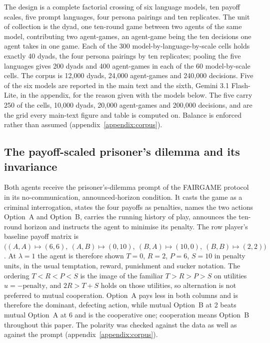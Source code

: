 \documentclass[openacc]{rsproca_new}
\newcommand{\lam}{\lambda}
\begin{document}
The design is a complete factorial crossing of six language models, ten payoff
scales, five prompt languages, four persona pairings and ten replicates. The
unit of collection is the dyad, one ten-round game between two agents of the
same model, contributing two agent-games, an agent-game being the ten decisions
one agent takes in one game. Each of the 300 model-by-language-by-scale cells
holds exactly 40 dyads, the four persona pairings by ten replicates; pooling
the five languages gives 200 dyads and 400 agent-games in each of the 60
model-by-scale cells. The corpus is 12{,}000 dyads, 24{,}000 agent-games and
240{,}000 decisions. Five of the six models are reported in the main text and
the sixth, Gemini 3.1 Flash-Lite, in the appendix, for the reason given with
the models below. The five carry 250 of the cells, 10{,}000 dyads, 20{,}000
agent-games and 200{,}000 decisions, and are the grid every main-text figure
and table is computed on. Balance is enforced rather than assumed
(appendix~\ref{appendix:corpus}).

\subsection{The payoff-scaled prisoner's dilemma and its invariance}\label{sec:gameImportance}

Both agents receive the prisoner's-dilemma prompt of the FAIRGAME
protocol~\cite{buscemi2025fairgame} in its no-communication, announced-horizon
condition. It casts the game as a criminal interrogation, states the four
payoffs as penalties, names the two actions Option~A and Option~B,
carries the running history of play, announces the ten-round horizon and
instructs the agent to minimise its penalty. The row player's baseline payoff
matrix is
$\bigl((A,A)\!\mapsto\!(6,6),\ (A,B)\!\mapsto\!(0,10),\
(B,A)\!\mapsto\!(10,0),\ (B,B)\!\mapsto\!(2,2)\bigr)$.
At $\lam = 1$ the agent is therefore shown $T = 0$, $R = 2$, $P = 6$, $S = 10$
in penalty units, in the usual temptation, reward, punishment and sucker
notation. The ordering $T < R < P < S$ is the image of the familiar
$T > R > P > S$ on utilities $u = -\text{penalty}$, and $2R > T + S$ holds on
those utilities, so alternation is not preferred to mutual cooperation.
Option~A pays less in both columns and is therefore the dominant, defecting
action, while mutual Option~B at 2 beats mutual Option~A at 6 and is the
cooperative one; cooperation means Option~B throughout this paper. The polarity
was checked against the data as well as against the prompt
(appendix~\ref{appendix:corpus}).
\end{document}

